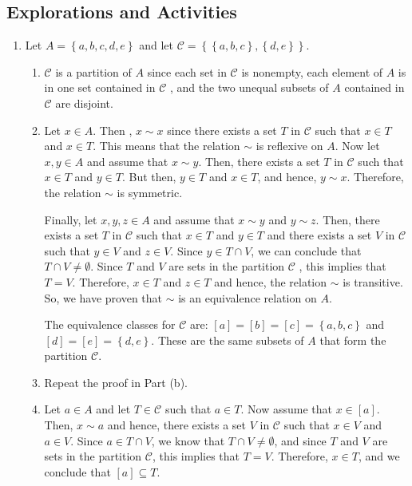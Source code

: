\subsection*{Explorations and Activities}
\setcounter{oldenumi}{\theenumi}
\begin{enumerate} \setcounter{enumi}{\theoldenumi}
\item Let  $A = \left\{ {a, b, c, d, e} \right\}$ and let  
$\mathcal{C} = \left\{ {\left\{ {a, b, c} \right\}, \left\{ {d, e} \right\}} \right\}$. 

\begin{enumerate}
\item $\mathcal{C}$ is a partition of $A$  since each set in  $\mathcal{C}$  is nonempty, each element of  $A$  is in one set contained in  $\mathcal{C}$ , and the two unequal subsets  of  $A$  contained in  $\mathcal{C}$  are disjoint.

\item Let  $x \in A$.  Then ,  $x \sim x$ since there exists a set  $T$  in  $\mathcal{C}$  such that  $x \in T$ and  $x \in T$.  This means that the relation  $\sim$  is reflexive on  $A$.
\vskip6pt
Now let  $x, y \in A$ and assume that  $x \sim y$.  Then, there exists a set  $T$  in  
$\mathcal{C}$  such that  $x \in T$ and  $y \in T$.  But then,  $y \in T$ and  $x \in T$, and hence,  $y \sim x$.  Therefore, the relation  $\sim$  is symmetric.
\vskip6pt

Finally, let  $x, y, z \in A$  and assume that  $x \sim y$  and  $y \sim z$.  Then, there exists a set  $T$  in  $\mathcal{C}$  such that  $x \in T$ and  $y \in T$  and  there exists a set  $V$  in  $\mathcal{C}$  such that  $y \in V$ and  $z \in V$.  Since  $y \in T \cap V$, we can conclude that  $T \cap V \ne \emptyset $.  Since  $T$  and  $V$  are sets in the partition  $\mathcal{C}$ , this implies that  $T = V$.  Therefore,  $x \in T$ and  $z \in T$ and hence, the relation  $\sim$  is transitive. So, we have proven that  $\sim$  is an equivalence relation on  $A$.
\vskip6pt

The equivalence classes for $\mathcal{C}$ are:  $\left[ a \right] = \left[ b \right] = \left[ c \right] = \left\{ {a, b, c} \right\}$  and   
$\left[ d \right] = \left[ e \right] = \left\{ {d, e} \right\}$.  These are the same subsets of 
$A$ that form the partition $\mathcal{C}$.


\item Repeat the proof in Part (b).

\item Let  $a \in A$  and let  $T \in \mathcal{C}$ such that  $a \in T$.  Now assume that  
$x \in \left[ a \right]$.  Then,  $x \sim a$ and hence,  there exists a set  $V$  in  
$\mathcal{C}$  such that  $x \in V$ and  $a \in V$.  Since  $a \in T \cap V$, we know that  
$T \cap V \ne \emptyset $, and  since  $T$  and  $V$  are sets in the partition  $\mathcal{C}$, this implies that  $T = V$.   Therefore, $x \in T$, and we conclude that  
$\left[ a \right] \subseteq T$.


\end{enumerate}
\end{enumerate}
